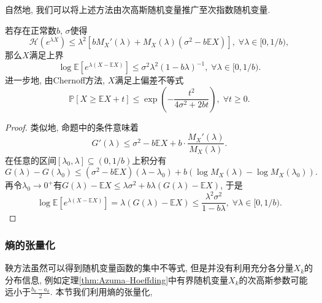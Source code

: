 自然地, 我们可以将上述方法由次高斯随机变量推广至次指数随机变量. 
\begin{proposition}[Bernstein熵的界]\label{thm:BernsteinEntropyBd}
	若存在正常数$b$, $\sigma$使得
	\begin{equation*}
		\mathcal{H}(e^{\lambda X}) 
		\leq \lambda^2 \left[ b M_X'(\lambda) + M_X(\lambda)(\sigma^2 - b \mathbb{E}X) \right],\;
		\forall \lambda \in [0, 1/b), 
	\end{equation*}
	那么$X$满足上界
	\begin{equation*}
		\log \mathbb{E}\left[ e^{\lambda(X - \mathbb{E}X)}\right] 
		\leq \sigma^2 \lambda^2 (1 - b \lambda)^{-1},\; 
		\forall \lambda \in [0, 1/b). 
	\end{equation*}
	进一步地, 由Chernoff方法, $X$满足上偏差不等式
	\begin{equation*}
		\mathbb{P}[X \geq \mathbb{E}X + t] 
		\leq \exp \left(- \frac{t^2}{4 \sigma^2 + 2b t} \right),\;
		\forall t \geq 0. 
	\end{equation*}
\end{proposition}
\begin{proof}
	类似地, 命题中的条件意味着
	\begin{equation*}
		G'(\lambda) 
		\leq \sigma^2 - b \mathbb{E}X + b \cdot \frac{M_X'(\lambda)}{M_X(\lambda)}. 
	\end{equation*}
	在任意的区间$[\lambda_0, \lambda] \subseteq (0, 1/b)$上积分有
	\begin{equation*}
		G(\lambda) - G(\lambda_0) 
		\leq (\sigma^2 - b \mathbb{E}X)(\lambda - \lambda_0) + b(\log M_X(\lambda) - \log M_X(\lambda_0)). 
	\end{equation*}
	再令$\lambda_0 \to 0^+$有$G(\lambda) - \mathbb{E}X \leq \lambda \sigma^2 + b \lambda (G(\lambda) - \mathbb{E}X)$, 于是
	\begin{equation*}
		\log \mathbb{E}\left[e^{\lambda(X - \mathbb{E}X)}\right]
		= \lambda(G(\lambda) - \mathbb{E}X)
		\leq \frac{\lambda^2 \sigma^2}{1 - b \lambda} ,\; 
		\forall \lambda \in [0, 1/b). 
	\end{equation*}
\end{proof}

\subsubsection{熵的张量化}

鞅方法虽然可以得到随机变量函数的集中不等式, 但是并没有利用充分各分量$X_k$的分布信息, 例如定理\ref{thm:Azuma–Hoeffding}中有界随机变量$X_k$的次高斯参数可能远小于$\frac{b_k - a_k}{2}$. 
本节我们利用熵的张量化, 

